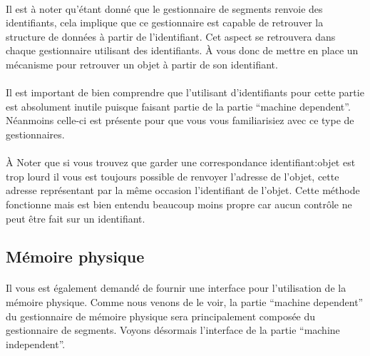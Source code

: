 \documentclass[10pt,a4wide]{article}
\begin{document}
\paragraph{}

Il est \`a noter qu'\'etant donn\'e que le gestionnaire de segments
renvoie des identifiants, cela implique que ce gestionnaire est capable
de retrouver la structure de donn\'ees \`a partir de l'identifiant. Cet aspect
se retrouvera dans chaque gestionnaire utilisant des identifiants. \`A vous
donc de mettre en place un m\'ecanisme pour retrouver un objet \`a partir
de son identifiant.

\paragraph{}

Il est important de bien comprendre que l'utilisant d'identifiants pour cette
partie est absolument inutile puisque faisant partie de la partie ``machine
dependent''. N\'eanmoins celle-ci est pr\'esente pour que vous vous
familiarisiez avec ce type de gestionnaires.

\paragraph{}

\`A Noter que si vous trouvez que garder une correspondance identifiant:objet
est trop lourd il vous est toujours possible de renvoyer l'adresse de l'objet,
cette adresse repr\'esentant par la m\^eme occasion l'identifiant de l'objet.
Cette m\'ethode fonctionne mais est bien entendu beaucoup moins propre car
aucun contr\^ole ne peut \^etre fait sur un identifiant.

\subsection{M\'emoire physique}

\paragraph{}

Il vous est \'egalement demand\'e de fournir une interface pour
l'utilisation de la m\'emoire physique. Comme nous venons de le voir,
la partie ``machine dependent'' du gestionnaire de m\'emoire physique
sera principalement compos\'ee du gestionnaire de segments. Voyons d\'esormais
l'interface de la partie ``machine independent''.
\end{document}
